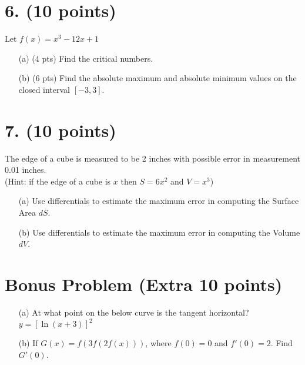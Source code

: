 \section*{6. (10 points)}
Let \( f(x) = x^3 - 12x + 1 \)
\begin{enumerate}
    \item[(a)] (4 pts) Find the critical numbers.
    \item[(b)] (6 pts) Find the absolute maximum and absolute minimum values on the closed interval \( [-3, 3] \).
\end{enumerate}

\section*{7. (10 points)}
The edge of a cube is measured to be 2 inches with possible error in measurement 0.01 inches. \\
(Hint: if the edge of a cube is \( x \) then \( S = 6x^2 \) and \( V = x^3 \))
\begin{enumerate}
    \item[(a)] Use differentials to estimate the maximum error in computing the Surface Area \( dS \).
    \item[(b)] Use differentials to estimate the maximum error in computing the Volume \( dV \).
\end{enumerate}

\section*{Bonus Problem (Extra 10 points)}
\begin{enumerate}
    \item[(a)] At what point on the below curve is the tangent horizontal? \\
    \( y = [\ln(x + 3)]^2 \)
    \item[(b)] If \( G(x) = f(3f(2f(x))) \), where \( f(0) = 0 \) and \( f'(0) = 2 \). Find \( G'(0) \).
\end{enumerate}


